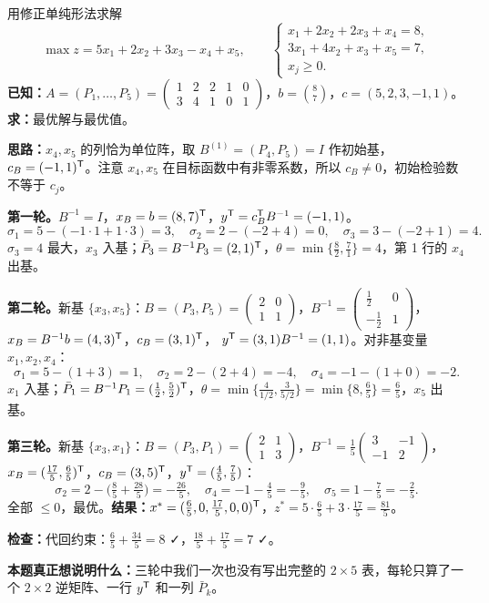 \begin{examplebox}[例 1.1　\srcTag{笔记 P2--P4}]
用修正单纯形法求解
\[
\max z=5x_1+2x_2+3x_3-x_4+x_5,\qquad
\begin{cases}x_1+2x_2+2x_3+x_4=8,\\ 3x_1+4x_2+x_3+x_5=7,\\ x_j\ge0.\end{cases}
\]
\textbf{已知：}$A=(P_1,\dots,P_5)=\begin{pmatrix}1&2&2&1&0\\3&4&1&0&1\end{pmatrix}$，$b=\binom87$，$c=(5,2,3,-1,1)$。\quad
\textbf{求：}最优解与最优值。\par
\textbf{思路：}$x_4,x_5$ 的列恰为单位阵，取 $B^{(1)}=(P_4,P_5)=I$ 作初始基，$c_B=(-1,1)^{\mathsf T}$。注意 $x_4,x_5$ 在目标函数中有非零系数，所以 $c_B\ne0$，初始检验数不等于 $c_j$。

\textbf{第一轮。}$B^{-1}=I$，$x_B=b=(8,7)^{\mathsf T}$，$y^{\mathsf T}=c_B^{\mathsf T} B^{-1}=(-1,1)$。
\[
\sigma_1=5-(-1\cdot1+1\cdot3)=3,\quad \sigma_2=2-(-2+4)=0,\quad \sigma_3=3-(-2+1)=4 .
\]
$\sigma_3=4$ 最大，$x_3$ 入基；$\bar P_3=B^{-1}P_3=(2,1)^{\mathsf T}$，$\theta=\min\{\frac82,\frac71\}=4$，第 1 行的 $x_4$ 出基。

\textbf{第二轮。}新基 $\{x_3,x_5\}$：$B=(P_3,P_5)=\begin{pmatrix}2&0\\1&1\end{pmatrix}$，$B^{-1}=\begin{pmatrix}\frac12&0\\-\frac12&1\end{pmatrix}$，$x_B=B^{-1}b=(4,3)^{\mathsf T}$，$c_B=(3,1)^{\mathsf T}$，
$y^{\mathsf T}=(3,1)B^{-1}=(1,1)$。对非基变量 $x_1,x_2,x_4$：
\[
\sigma_1=5-(1+3)=1,\quad \sigma_2=2-(2+4)=-4,\quad \sigma_4=-1-(1+0)=-2 .
\]
$x_1$ 入基；$\bar P_1=B^{-1}P_1=(\frac12,\frac52)^{\mathsf T}$，$\theta=\min\{\frac{4}{1/2},\frac{3}{5/2}\}=\min\{8,\frac65\}=\frac65$，$x_5$ 出基。

\textbf{第三轮。}新基 $\{x_3,x_1\}$：$B=(P_3,P_1)=\begin{pmatrix}2&1\\1&3\end{pmatrix}$，$B^{-1}=\frac15\begin{pmatrix}3&-1\\-1&2\end{pmatrix}$，$x_B=(\frac{17}{5},\frac65)^{\mathsf T}$，$c_B=(3,5)^{\mathsf T}$，$y^{\mathsf T}=(\frac45,\frac75)$：
\[
\sigma_2=2-\bigl(\tfrac85+\tfrac{28}{5}\bigr)=-\tfrac{26}{5},\quad
\sigma_4=-1-\tfrac45=-\tfrac95,\quad \sigma_5=1-\tfrac75=-\tfrac25 .
\]
全部 $\le0$，最优。\quad\textbf{结果：}$x^*=(\frac65,0,\frac{17}{5},0,0)^{\mathsf T}$，$z^*=5\cdot\frac65+3\cdot\frac{17}{5}=\frac{81}{5}$。\par
\textbf{检查：}代回约束：$\frac65+\frac{34}{5}=8$ ✓，$\frac{18}{5}+\frac{17}{5}=7$ ✓。\par
\textbf{本题真正想说明什么：}三轮中我们一次也没有写出完整的 $2\times5$ 表，每轮只算了一个 $2\times2$ 逆矩阵、一行 $y^{\mathsf T}$ 和一列 $\bar P_k$。
\end{examplebox}

